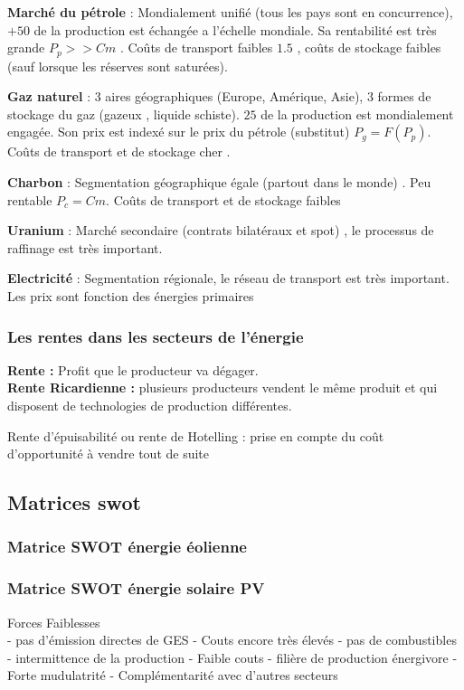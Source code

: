 \documentclass{article}
\begin{document}
\textbf{Marché du pétrole} : Mondialement unifié (tous les pays sont en concurrence), \( +50 \) de la production est échangée a l'échelle mondiale. Sa rentabilité est très grande \( P_p >> Cm \) . Coûts de transport faibles \( 1.5 \) , coûts de stockage faibles (sauf lorsque les réserves sont saturées).

\textbf{Gaz naturel} : 3 aires géographiques (Europe, Amérique, Asie), 3 formes de stockage du gaz (gazeux , liquide schiste). \( 25 \) de la production est mondialement engagée. Son prix est indexé sur le prix du pétrole (substitut) \( P_g = F(P_p) \). Coûts de transport et de stockage cher .

\textbf{Charbon} : Segmentation géographique égale (partout dans le monde) . Peu rentable \( P_c  = Cm \). Coûts de transport et de stockage faibles

\textbf{Uranium} : Marché secondaire (contrats bilatéraux et spot) , le processus de raffinage est très important. 

\textbf{Electricité} : Segmentation régionale, le réseau de transport est très important. Les prix sont fonction des énergies primaires

\subsubsection{Les rentes dans les secteurs de l'énergie}
\textbf{Rente :} Profit que le producteur va dégager.\\
\textbf{Rente Ricardienne :} plusieurs producteurs vendent le même produit et qui disposent de technologies de production différentes.

Rente d'épuisabilité ou rente de Hotelling : prise en compte du coût d'opportunité à vendre tout de suite 


\subsection{Matrices swot}
\subsubsection{Matrice SWOT énergie éolienne}
\subsubsection{Matrice SWOT énergie solaire PV}
	Forces  Faiblesses \\
	- pas d'émission directes de GES  	- Couts encore très élevés
	- pas de combustibles  	- intermittence de la production
	- Faible couts  	- filière de production énergivore
	- Forte mudulatrité 
	- Complémentarité avec d'autres secteurs
	
\end{document}
